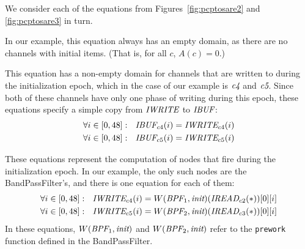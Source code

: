 We consider each of the equations from Figures~\ref{fig:pcptosare2} and \ref{fig:pcptosare3} in turn.


In our example, this equation always has an empty domain, as there are
no channels with initial items.  (That is, for all $c$, $A(c) = 0$.)


This equation has a non-empty domain for channels that are written to
during the initialization epoch, which in the case of our example is
$\mbox{\it c4}$ and $\mbox{\it c5}$.  Since both of these channels have only one
phase of writing during this epoch, these equations specify a simple
copy from $\mbox{\it IWRITE}$ to $\mbox{\it IBUF}$:
\begin{align*}
\forall i \in [0, 48]:~~\mbox{\it IBUF}_{c4}(i) &= \mbox{\it IWRITE}_{c4}(i) \\
\forall i \in [0, 48]:~~\mbox{\it IBUF}_{c5}(i) &= \mbox{\it IWRITE}_{c5}(i)
\end{align*}


These equations represent the computation of nodes that fire during
the initialization epoch.  In our example, the only such nodes are the
BandPassFilter's, and there is one equation for each of them:
\begin{align*}
\forall i \in [0, 48]:~~\mbox{\it IWRITE}_{c4}(i) &= W(\mbox{\it BPF}_1, \mbox{\it init})(\mbox{\it IREAD}_{c2}(*))[0][i] \\
\forall i \in [0, 48]:~~\mbox{\it IWRITE}_{c5}(i) &= W(\mbox{\it BPF}_2, \mbox{\it init})(\mbox{\it IREAD}_{c3}(*))[0][i]
\end{align*}
In these equations, $W(\mbox{\it BPF}_1, \mbox{\it init})$ and $W(\mbox{\it BPF}_2,
\mbox{\it init})$ refer to the {\tt prework} function defined in the
BandPassFilter.


